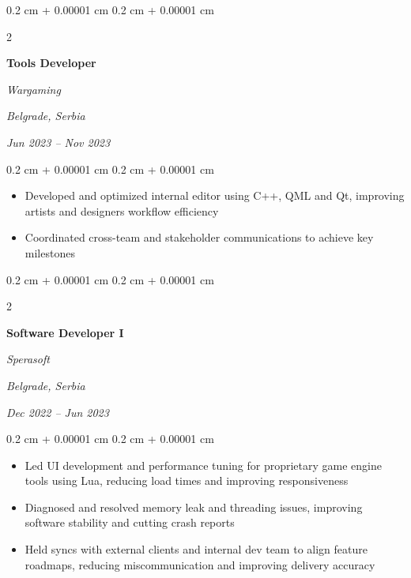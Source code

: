 \documentclass[10pt, letterpaper]{article}
\newenvironment{highlights}{
    \begin{itemize}[
        topsep=0.10 cm,
        parsep=0.10 cm,
        partopsep=0pt,
        itemsep=0pt,
        leftmargin=0.4 cm + 10pt
    ]
}{
    \end{itemize}
} %
\newenvironment{onecolentry}{
    \begin{adjustwidth}{
        0.2 cm + 0.00001 cm
    }{
        0.2 cm + 0.00001 cm
    }
}{
    \end{adjustwidth}
} %
\newenvironment{twocolentry}[2][]{
    \onecolentry
    \def\secondColumn{#2}
    \setcolumnwidth{\fill, 4.5 cm}
    \begin{paracol}{2}
}{
    \switchcolumn \raggedleft \secondColumn
    \end{paracol}
    \endonecolentry
} %
\begin{document}
        \vspace{0.2 cm}


\begin{twocolentry}{
        \textit{Belgrade, Serbia}    
            
        \textit{Jun 2023 – Nov 2023}}
            \textbf{Tools Developer}
            
            \textit{Wargaming}
        \end{twocolentry}

        \vspace{0.10 cm}
        \begin{onecolentry}
            \begin{highlights}
                \item Developed and optimized internal editor using C++, QML and Qt, improving artists and designers workflow efficiency
                \item Coordinated cross-team and stakeholder communications to achieve key milestones
            \end{highlights}
        \end{onecolentry}


        \vspace{0.2 cm}
        
        \begin{twocolentry}{
        \textit{Belgrade, Serbia}    
            
        \textit{Dec 2022 – Jun 2023}}
            \textbf{Software Developer I}
            
            \textit{Sperasoft}
        \end{twocolentry}

        \vspace{0.10 cm}
        \begin{onecolentry}
            \begin{highlights}
                \item Led UI development and performance tuning for proprietary game engine tools using Lua, reducing load times and improving responsiveness
                \item Diagnosed and resolved memory leak and threading issues, improving software stability and cutting crash reports
                \item Held syncs with external clients and internal dev team to align feature roadmaps, reducing miscommunication and improving delivery accuracy
            \end{highlights}
        \end{onecolentry}
\end{document}
